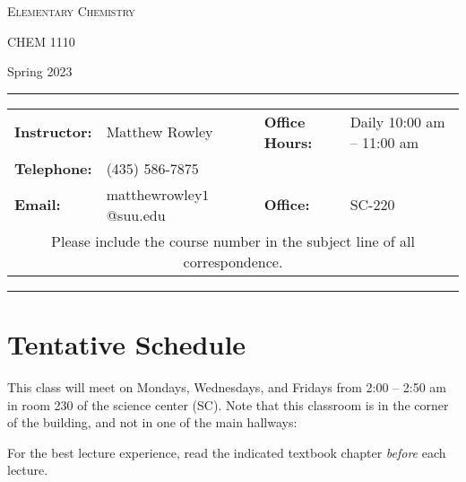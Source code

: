 \documentclass[12pt, letterpaper]{article}
\begin{document}
\begin{center}
	{\Large \textsc{Elementary Chemistry}}
	
	CHEM 1110
\end{center}

\begin{center}
	{\large Spring 2023}
\end{center}
\begin{center}
	\rule{0.99\textwidth}{0.4pt}
	\begin{tabular}{llcll}
		\textbf{Instructor:} & Matthew Rowley           &  & \textbf{Office Hours:} & Daily 10:00 am -- 11:00 am \\
		\textbf{Telephone:}  & (435) 586-7875           &  &                        &                            \\
		\textbf{Email:}      & matthewrowley$1$@suu.edu &  & \textbf{Office:}       & SC-220                     \\
		\multicolumn{5}{c}{Please include the course number in the subject line of all correspondence.}
	\end{tabular}
	\rule{0.99\textwidth}{0.4pt}
\end{center}


\section*{Tentative Schedule}
This class will meet on Mondays, Wednesdays, and Fridays from 2:00  -- 2:50
am in room 230 of the science center (SC). Note that this classroom is in the corner of the building, and not in one of the main hallways:

\noindent For the best lecture experience, read the indicated textbook chapter \emph{before} each lecture.
\end{document}
